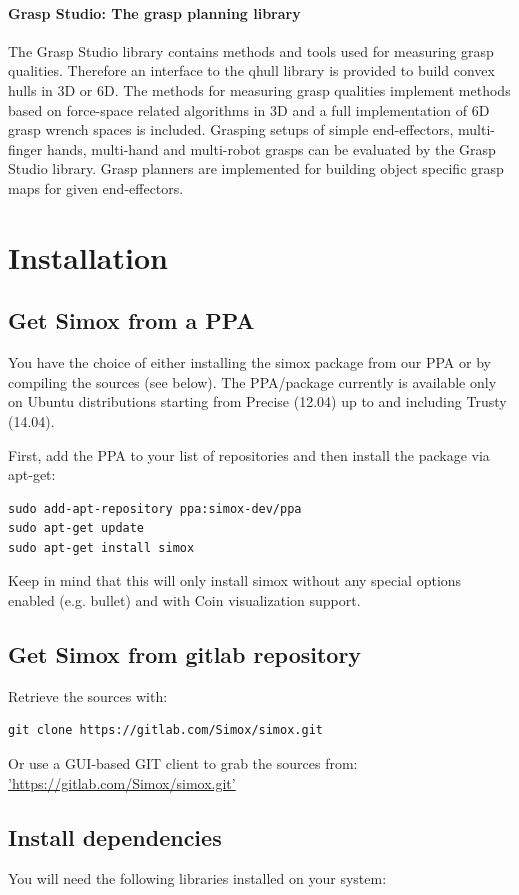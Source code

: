 \documentclass{book}
\begin{document}
\subsubsection{Grasp Studio: The grasp planning library}
The Grasp Studio library contains methods and tools used for measuring grasp qualities. Therefore an interface to the qhull library is provided to build convex hulls in 3D or 6D. The methods for measuring grasp qualities implement methods based on force-space related algorithms in 3D and a full implementation of 6D grasp wrench spaces is included. Grasping setups of simple end-effectors, multi-finger hands, multi-hand and multi-robot grasps can be evaluated by the Grasp Studio library. Grasp planners are implemented for building object specific grasp maps for given end-effectors. 
\chapter{Installation}
\section{Get Simox from a PPA}
You have the choice of either installing the simox package from our PPA or by compiling the sources (see below). The PPA/package currently is available only on Ubuntu distributions starting from Precise (12.04) up to and including Trusty (14.04).
\par
First, add the PPA to your list of repositories and then install the package via apt-get: 
\begin{lstlisting}
sudo add-apt-repository ppa:simox-dev/ppa
sudo apt-get update
sudo apt-get install simox
\end{lstlisting}
Keep in mind that this will only install simox without any special options enabled (e.g. bullet) and with Coin visualization support. 
\section{Get Simox from gitlab repository}
Retrieve the sources with: 
\begin{lstlisting}
git clone https://gitlab.com/Simox/simox.git
\end{lstlisting}
Or use a GUI-based GIT client to grab the sources from: 
\hyperref[simox gitlab]{'https://gitlab.com/Simox/simox.git'}
\section{Install dependencies}
You will need the following libraries installed on your system: 
\end{document}

